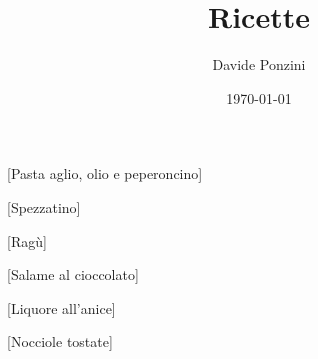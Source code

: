 \documentclass[a4paper, 11pt]{article}
\title{Ricette}
\author{Davide Ponzini}
\date{\today}
\begin{document}
\makeheader

% 

[Pasta aglio, olio e peperoncino]












[Spezzatino]






















[Ragù]







[Salame al cioccolato]









[Liquore all'anice]


[Nocciole tostate]




\end{document}
